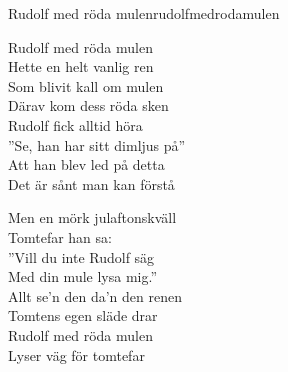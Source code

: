 \begin{song}{Rudolf med röda mulen}{rudolfmedrodamulen}
\begin{vers}
Rudolf med röda mulen\\
Hette en helt vanlig ren\\
Som blivit kall om mulen\\
Därav kom dess röda sken\\
Rudolf fick alltid höra\\
''Se, han har sitt dimljus på''\\
Att han blev led på detta\\
Det är sånt man kan förstå\\
\end{vers}
\begin{vers}
Men en mörk julaftonskväll\\
Tomtefar han sa:\\
''Vill du inte Rudolf säg\\
Med din mule lysa mig.''\\
Allt se'n den da'n den renen\\
Tomtens egen släde drar\\
Rudolf med röda mulen\\
Lyser väg för tomtefar\\
\end{vers}
\end{song}
